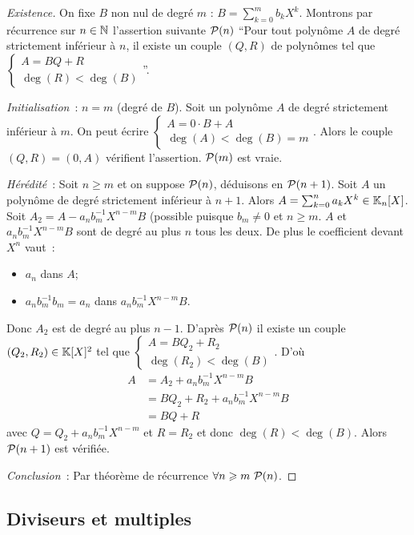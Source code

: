 \begin{proof}[Existence]
  On fixe \(B\) non nul de degré \(m\) : \(B = \sum_{k=0}^m b_k X^k\). Montrons par récurrence sur \(n \in \N\) l'assertion suivante \(\P(n)\) ``Pour tout polynôme \(A\) de degré strictement inférieur à \(n\), il existe un couple \((Q,R)\) de polynômes tel que \(\begin{cases} A=BQ+R \\ \deg(R) < \deg(B)\end{cases}\)''.

  \emph{Initialisation}~: \(n=m\) (degré de \(B\)). Soit un polynôme \(A\) de degré strictement inférieur à \(m\). On peut écrire \(\begin{cases} A=0 \cdot B+A \\ \deg(A) < \deg(B)=m\end{cases}\). Alors le couple \((Q,R)=(0,A)\) vérifient l'assertion. \(\P(m)\) est vraie.

  \emph{Hérédité}~: Soit \(n \geqslant m\) et on suppose \(\P(n)\), déduisons en \(\P(n+1)\). Soit \(A\) un polynôme de degré strictement inférieur à \(n+1\). Alors \(A=\sum_{k=0}^n a_k X^k \in \K_n[X]\). Soit \(A_2 = A-a_nb_m^{-1}X^{n-m}B\) (possible puisque \(b_m \neq 0\) et \(n \geqslant m\). \(A\) et \(a_nb_m^{-1}X^{n-m}B\) sont de degré au plus \(n\) tous les deux. De plus le coefficient devant \(X^n\) vaut~:
  \begin{itemize}
  \item \(a_n\) dans \(A\);
  \item \(a_nb_m^{-1}b_m=a_n\) dans \(a_nb_m^{-1}X^{n-m}B\).
  \end{itemize}
  Donc \(A_2\) est de degré au plus \(n-1\). D'après \(\P(n)\) il existe un couple \((Q_2,R_2) \in \K[X]^2\) tel que \(\begin{cases} A=BQ_2+R_2 \\ \deg(R_2) < \deg(B)\end{cases}\). D'où
  \begin{align}
    A&=A_2 + a_n b_m^{-1}X^{n-m}B\\
    &=BQ_2+R_2 +a_n b_m^{-1}X^{n-m}B\\
    &=BQ+R
  \end{align}
  avec \(Q=Q_2+a_n b_m^{-1}X^{n-m}\) et \(R=R_2\) et donc \(\deg(R) < \deg(B)\). Alors \(\P(n+1)\) est vérifiée.

  \emph{Conclusion}~: Par théorème de récurrence \(\forall n \geqslant m \ \P(n)\).
\end{proof}

\subsection{Diviseurs et multiples}

